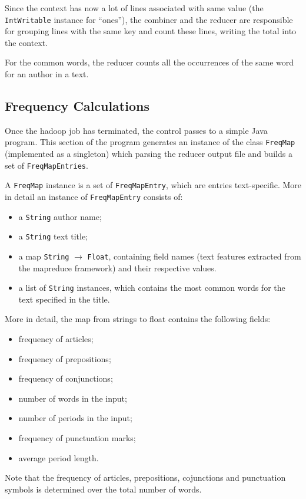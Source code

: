 \documentclass[a4paper,11pt, twoside]{article}
\begin{document}
	Since the context has now a lot of lines associated with same value (the \lstinline|IntWritable| instance for ``ones''), the combiner and the reducer are responsible for grouping lines with the same key and count these lines, writing the total into the context.
	
	For the common words, the reducer counts all the occurrences of the same word for an author in a text.
	
	\subsection{Frequency Calculations}
	Once the hadoop job has terminated, the control passes to a simple Java program. This section of the program generates an instance of the class \lstinline|FreqMap| (implemented as a singleton) which parsing the reducer output file and builds a set of \lstinline|FreqMapEntries|.
	
	A \lstinline|FreqMap| instance is a set of \lstinline|FreqMapEntry|, which are entries text-specific. More in detail an instance of \lstinline|FreqMapEntry| consists of: \begin{itemize}
		\item a \lstinline|String| author name;
		\item a \lstinline|String| text title;
		\item a map \lstinline|String| $\to$ \lstinline|Float|, containing field names (text features extracted from the mapreduce framework) and their respective values.
		\item  a list of \lstinline|String| instances, which contains the most common words for the text specified in the title.
	\end{itemize}

	More in detail, the map from strings to float contains the following fields: \begin{itemize}
		\item frequency of articles;
		\item frequency of prepositions;
		\item frequency of conjunctions;
		\item number of words in the input;
		\item number of periods in the input;
		\item frequency of punctuation marks;
		\item average period length.
	\end{itemize}

	Note that the frequency of articles, prepositions, cojunctions and punctuation symbols is determined over the total number of words.
	
\end{document}
